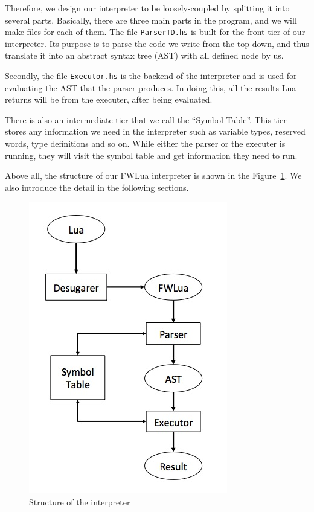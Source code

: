 Therefore, we design our interpreter to be loosely-coupled by splitting it into several parts. Basically, there are three main parts in the program, and we will make files for each of them. The file {\tt ParserTD.hs} is built for the front tier of our interpreter. Its purpose is to parse the code we write from the top down, and thus translate it into an
abstract syntax tree (AST) with all defined node by us. 

Secondly, the file {\tt Executor.hs} is the backend of the interpreter and is used for evaluating the AST that the parser produces. In doing this, all the results Lua returns will be from the executer, after being evaluated. 

There is also an intermediate tier that we call the ``Symbol Table''. This tier stores any information we need in the interpreter such as variable types, reserved words, type definitions and so on. While either the parser or the executer is running, they will visit the symbol table and get information they need to run. 

Above all, the structure of our FWLua interpreter is shown in the Figure~\ref {fig:structure}. We also introduce the detail in the following sections. 

\begin{figure}
\centering
\caption{Structure of the interpreter}
\label{fig:structure}
\includegraphics[scale = 0.9]{Interpreter}
\end{figure}

